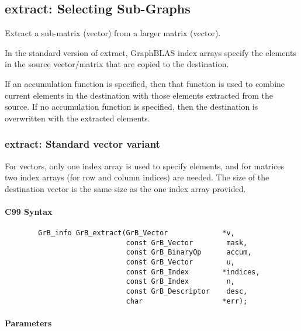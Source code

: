 \subsection{{\sf extract}: Selecting Sub-Graphs}
\label{Sec:extract}

Extract a sub-matrix (vector) from a larger matrix (vector). 

In the standard version of {\sf extract}, GraphBLAS index arrays
specify the elements in the source vector/matrix that are copied to
the destination. 

If an accumulation function is specified, then that function is
used to combine current elements in the destination with those elements
extracted from the source. If no accumulation function is specified, then
the destination is overwritten with the extracted elements.  


\subsubsection{{\sf extract}: Standard vector variant}

For vectors, only one index array is used to specify
elements, and for matrices two index arrays (for row and column indices)
are needed.  The size of the destination vector is the same size as
the one index array provided.  

\paragraph{C99 Syntax}

\begin{verbatim}
        GrB_info GrB_extract(GrB_Vector             *v,
                             const GrB_Vector        mask,
                             const GrB_BinaryOp      accum,
                             const GrB_Vector        u,
                             const GrB_Index        *indices,
                             const GrB_Index         n,
                             const GrB_Descriptor    desc,
                             char                   *err);
\end{verbatim}

\paragraph{Parameters}

